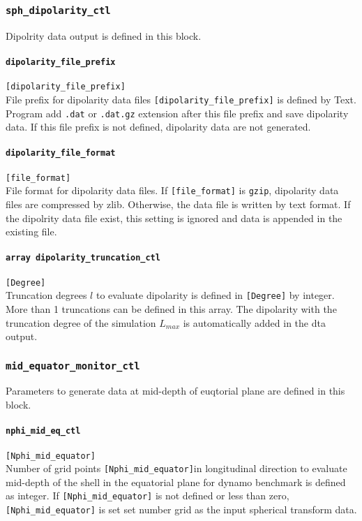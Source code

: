 %
\subsubsection{\tt sph\_dipolarity\_ctl}
\label{href_t:sph_dipolarity_ctl}
Dipolrity data output is defined in this block.

\paragraph{\tt dipolarity\_file\_prefix}
\label{href_t:dipolarity_file_prefix}
\verb|[dipolarity_file_prefix]| \\
File prefix for dipolarity data files \verb|[dipolarity_file_prefix]| is defined by Text. Program add {\tt .dat} or {\tt .dat.gz} extension after this file prefix and save dipolarity data. If this file prefix is not defined, dipolarity data are not generated.

\paragraph{\tt dipolarity\_file\_format}
\label{href_t:dipolarity_file_format}
\verb|[file_format]| \\
File format for dipolarity data files. If \verb|[file_format]| is \verb|gzip|, dipolarity data files are compressed by zlib. Otherwise, the data file is written by text format. If the dipolrity data file exist, this setting is ignored and data is appended in the existing file.

\paragraph{\tt array dipolarity\_truncation\_ctl}
\label{href_t:dipolarity_truncation_ctl}
\verb|[Degree]| \\
Truncation degrees $l$ to evaluate dipolarity is defined in \verb|[Degree]| by integer. More than 1 truncations can be defined in this array. The dipolarity with the truncation degree of the simulation $L_{max}$ is automatically added in the dta output.


\subsubsection{\tt mid\_equator\_monitor\_ctl}
\label{href_t:mid_equator_monitor_ctl}
Parameters to generate data at mid-depth of euqtorial plane are defined in this block.

\paragraph{\tt nphi\_mid\_eq\_ctl}
\label{href_t:nphi_mid_eq_ctl}
\verb|[Nphi_mid_equator]| \\
Number of grid points \verb|[Nphi_mid_equator]|in longitudinal direction to evaluate mid-depth of the shell in the equatorial plane for dynamo benchmark is defined as integer. If \verb|[Nphi_mid_equator]| is not defined or less than zero, \verb|[Nphi_mid_equator]| is set set number grid as the input spherical transform data. 
%
%

